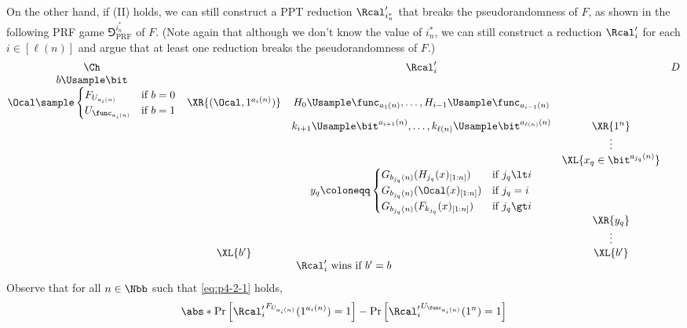 \begin{answer}[b]
    On the other hand, if (II) holds,  we can still construct a PPT reduction $\Rcal'_{i^\ast_n}$ that breaks the pseudorandomness of $F$, as shown in the following PRF game $\Game^{i^\ast_n}_{\textrm{PRF}}$ of $F$. (Note again that although we don't know the value of $i^\ast_n$, we can still construct a reduction $\Rcal'_i$ for each $i\in [\ell(n)]$ and argue that at least one reduction breaks the pseudorandomness of $F$.)
    {
        \[
            \begin{array}{@{} c c c c c@{}}
            \Ch & & \Rcal'_i & & D \\
            b\Usample\bit & &  & & \\
            \Ocal \sample \begin{cases}
                F_{U_{a_i(n)}} &\textrm{if } b=0\\
                U_{\func_{a_i(n)}} &\textrm{if } b=1
            \end{cases} & \XR{(\Ocal, 1^{a_i(n)})} &   H_0\Usample\func_{a_1(n)},\ldots,H_{i-1}\Usample\func_{a_{i-1}(n)} & & \\
            &  & k_{i+1}\Usample\bit^{a_{i+1}(n)},\ldots,k_{\ell(n)}\Usample\bit^{a_{\ell(n)}(n)} & \XR{1^n} & \\
            & & & \vdots & \\
            & & & \XL{x_q\in\bit^{a_{j_q}(n)}} & \\
            & & y_q \coloneqq \begin{cases}
               G_{b_{j_q}(n)}(H_{j_q}(x)_{[1:n]}) &\textrm{if } j_q\lt i\\
               G_{b_{j_q}(n)}(\Ocal(x)_{[1:n]}) &\textrm{if } j_q=i\\
               G_{b_{j_q}(n)}(F_{k_{j_q}}(x)_{[1:n]}) &\textrm{if } j_q\gt i
            \end{cases} & & \\
            & & & \XR{y_q} & \\
            & & & \vdots & \\
            & \XL{b'} & & \XL{b'} & \\
            \multicolumn{5}{c}{\text{$\Rcal'_i$ wins if $b' = b$}}
            \end{array}
        \]
        \label{fig:p4-game3}
    }
    Observe that for all $n\in\Nbb$ such that \eqref{eq:p4-2-1} holds,
    \begin{align*}
        &\abs*{\Pr\left[{\Rcal'_i}^{F_{U_{a_i(n)}}}(1^{a_i(n)})=1  \right] - \Pr\left[{\Rcal'_i}^{U_{\func_{a_i(n)}}}(1^n)=1  \right]}\\

\end{align*}
\end{answer}
